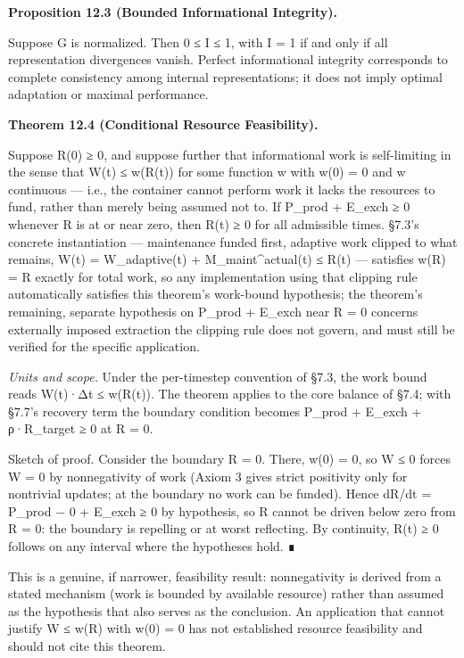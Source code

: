 \documentclass[
]{article}
\begin{document}
\textbf{Proposition 12.3 (Bounded Informational Integrity).}

Suppose G is normalized. Then 0 ≤ I ≤ 1, with I = 1 if and only if all
representation divergences vanish. Perfect informational integrity
corresponds to complete consistency among internal representations; it
does not imply optimal adaptation or maximal performance.

\textbf{Theorem 12.4 (Conditional Resource Feasibility).}

Suppose R(0) ≥ 0, and suppose further that informational work is
self-limiting in the sense that W(t) ≤ w(R(t)) for some function w with
w(0) = 0 and w continuous --- i.e., the container cannot perform work it
lacks the resources to fund, rather than merely being assumed not to. If
P\_prod + E\_exch ≥ 0 whenever R is at or near zero, then R(t) ≥ 0 for
all admissible times. §7.3's concrete instantiation --- maintenance
funded first, adaptive work clipped to what remains, W(t) =
W\_adaptive(t) + M\_maint\^{}actual(t) ≤ R(t) --- satisfies w(R) = R
exactly for total work, so any implementation using that clipping rule
automatically satisfies this theorem's work-bound hypothesis; the
theorem's remaining, separate hypothesis on P\_prod + E\_exch near R = 0
concerns externally imposed extraction the clipping rule does not
govern, and must still be verified for the specific application.

\emph{Units and scope.} Under the per-timestep convention of §7.3, the
work bound reads W(t)·Δt ≤ w(R(t)). The theorem applies to the core
balance of §7.4; with §7.7's recovery term the boundary condition
becomes P\_prod + E\_exch + ρ·R\_target ≥ 0 at R = 0.

Sketch of proof. Consider the boundary R = 0. There, w(0) = 0, so W ≤ 0
forces W = 0 by nonnegativity of work (Axiom 3 gives strict positivity
only for nontrivial updates; at the boundary no work can be funded).
Hence dR/dt = P\_prod − 0 + E\_exch ≥ 0 by hypothesis, so R cannot be
driven below zero from R = 0: the boundary is repelling or at worst
reflecting. By continuity, R(t) ≥ 0 follows on any interval where the
hypotheses hold. ∎

This is a genuine, if narrower, feasibility result: nonnegativity is
derived from a stated mechanism (work is bounded by available resource)
rather than assumed as the hypothesis that also serves as the
conclusion. An application that cannot justify W ≤ w(R) with w(0) = 0
has not established resource feasibility and should not cite this
theorem.
\end{document}
